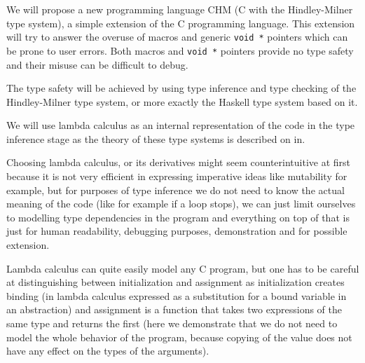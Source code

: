 

We will propose a new programming language CHM (C with the Hindley-Milner type system), a simple extension of the C programming language. This extension will try to answer the overuse of macros and generic \lstinline{void *} pointers which can be prone to user errors. Both macros and \lstinline{void *} pointers provide no type safety and their misuse can be difficult to debug.

The type safety will be achieved by using type inference and type checking of the Hindley-Milner type system, or more exactly the Haskell type system based on it.

We will use lambda calculus as an internal representation of the code in the type inference stage as the theory of these type systems is described on in.

Choosing lambda calculus, or its derivatives might seem counterintuitive at first because it is not very efficient in expressing imperative ideas like mutability for example, but for purposes of type inference we do not need to know the actual meaning of the code (like for example if a loop stops), we can just limit ourselves to modelling type dependencies in the program and everything on top of that is just for human readability, debugging purposes, demonstration and for possible extension.

Lambda calculus can quite easily model any C program, but one has to be careful at distinguishing between initialization and assignment as initialization creates binding (in lambda calculus expressed as a substitution for a bound variable in an abstraction) and assignment is a function that takes two expressions of the same type and returns the first (here we demonstrate that we do not need to model the whole behavior of the program, because copying of the value does not have any effect on the types of the arguments).
